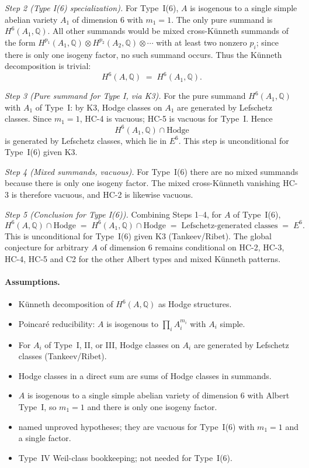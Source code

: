 \documentclass{article}
\begin{document}
\emph{Step 2 (Type I(6) specialization).} For Type~I(6), $A$ is isogenous to a single simple abelian variety $A_1$ of dimension $6$ with $m_1 = 1$. The only pure summand is $H^6(A_1,\mathbb{Q})$. All other summands would be mixed cross-K\"unneth summands of the form $H^{p_1}(A_1,\mathbb{Q}) \otimes H^{p_2}(A_2,\mathbb{Q}) \otimes \cdots$ with at least two nonzero $p_i$; since there is only one isogeny factor, no such summand occurs. Thus the K\"unneth decomposition is trivial:
\[
H^6(A,\mathbb{Q}) \;=\; H^6(A_1,\mathbb{Q}).
\]

\emph{Step 3 (Pure summand for Type I, via K3).} For the pure summand $H^6(A_1,\mathbb{Q})$ with $A_1$ of Type~I: by K3, Hodge classes on $A_1$ are generated by Lefschetz classes. Since $m_1 = 1$, HC-4 is vacuous; HC-5 is vacuous for Type~I. Hence
\[
H^6(A_1,\mathbb{Q}) \cap \mathrm{Hodge}
\]
is generated by Lefschetz classes, which lie in $E^6$. This step is unconditional for Type~I(6) given K3.

\emph{Step 4 (Mixed summands, vacuous).} For Type~I(6) there are no mixed summands because there is only one isogeny factor. The mixed cross-K\"unneth vanishing HC-3 is therefore vacuous, and HC-2 is likewise vacuous.

\emph{Step 5 (Conclusion for Type I(6)).} Combining Steps 1--4, for $A$ of Type~I(6),
\[
H^6(A,\mathbb{Q}) \cap \mathrm{Hodge}
\;=\; H^6(A_1,\mathbb{Q}) \cap \mathrm{Hodge}
\;=\; \text{Lefschetz-generated classes}
\;=\; E^6.
\]
This is unconditional for Type~I(6) given K3 (Tankeev/Ribet). The global conjecture for arbitrary $A$ of dimension $6$ remains conditional on HC-2, HC-3, HC-4, HC-5 and C2 for the other Albert types and mixed K\"unneth patterns.

\paragraph{Assumptions.}
\begin{itemize}
  \item[K1:] K\"unneth decomposition of $H^6(A,\mathbb{Q})$ as Hodge structures.
  \item[K2:] Poincar\'e reducibility: $A$ is isogenous to $\prod_i A_i^{m_i}$ with $A_i$ simple.
  \item[K3:] For $A_i$ of Type~I, II, or III, Hodge classes on $A_i$ are generated by Lefschetz classes (Tankeev/Ribet).
  \item[K6:] Hodge classes in a direct sum are sums of Hodge classes in summands.
  \item[Type I(6):] $A$ is isogenous to a single simple abelian variety of dimension $6$ with Albert Type~I, so $m_1 = 1$ and there is only one isogeny factor.
  \item[HC-2, HC-3, HC-4, HC-5:] named unproved hypotheses; they are vacuous for Type~I(6) with $m_1 = 1$ and a single factor.
  \item[C2:] Type~IV Weil-class bookkeeping; not needed for Type~I(6).
\end{itemize}
\end{document}
